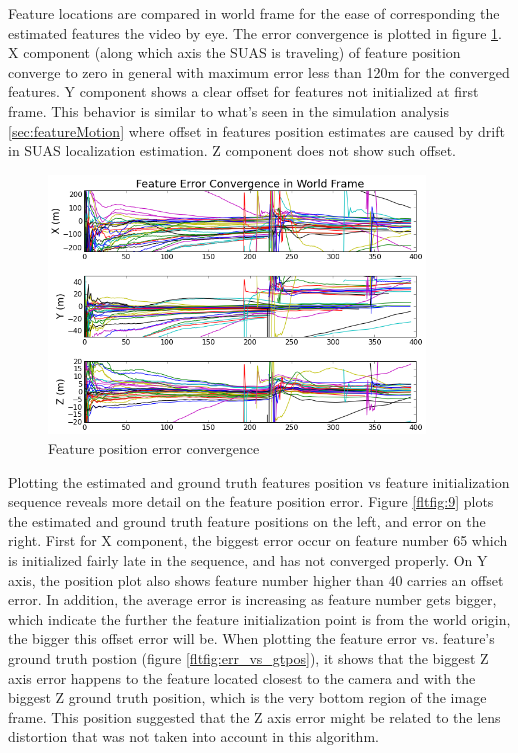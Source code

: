 Feature locations are compared in world frame for the ease of
corresponding the estimated features the video by eye. The error
convergence is plotted in figure \ref{fltfig:8}. X component (along
which axis the SUAS is traveling) of feature position converge to zero
in general with maximum error less than 120m for the converged
features. Y component shows a clear offset for features not
initialized at first frame. This behavior is similar to what's seen in
the simulation analysis \ref{sec:featureMotion} where offset in
features position estimates are caused by drift in SUAS localization
estimation. Z component does not show such offset.

\begin{figure}[h]
\centering
\includegraphics[width=10cm, keepaspectratio=true]
{./Figures/fltfig/cut1/Figure50.png}
\caption{Feature position error convergence}
\label{fltfig:8}
\end{figure}

Plotting the estimated and ground truth features position vs feature
initialization sequence reveals more detail on the feature position
error. Figure \ref{fltfig:9} plots the estimated and ground truth
feature positions on the left, and error on the right. First for X
component, the biggest error occur on feature number 65 which is
initialized fairly late in the sequence, and has not converged
properly. On Y axis, the position plot also shows feature number
higher than 40 carries an offset error. In addition, the average error
is increasing as feature number gets bigger, which indicate the
further the feature initialization point is from the world origin, the
bigger this offset error will be. When plotting the feature error vs.
feature's ground truth postion (figure \ref{fltfig:err_vs_gtpos}), it
shows that the biggest Z axis error happens to the feature located
closest to the camera and with the biggest Z ground truth position,
which is the very bottom region of the image frame. This position
suggested that the Z axis error might be related to the lens
distortion that was not taken into account in this algorithm.


